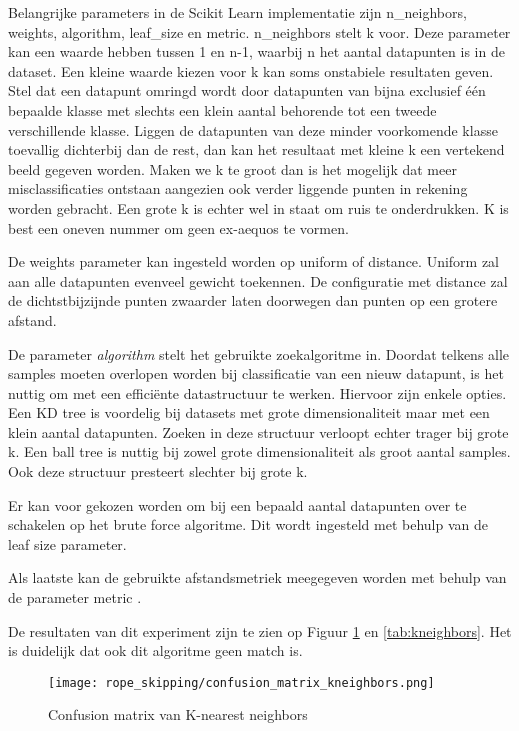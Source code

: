 Belangrijke parameters in de Scikit Learn implementatie zijn n\_neighbors, weights, algorithm, leaf\_size en metric.
n\_neighbors stelt k voor. Deze parameter kan een waarde hebben tussen 1 en n-1, waarbij n het aantal datapunten is in de dataset. Een kleine waarde kiezen voor k kan soms onstabiele resultaten geven. Stel dat een datapunt omringd wordt door datapunten van bijna exclusief één bepaalde klasse met slechts een klein aantal behorende tot een tweede verschillende klasse. Liggen de datapunten van deze minder voorkomende klasse toevallig dichterbij dan de rest, dan kan het resultaat met kleine k een vertekend beeld gegeven worden.
Maken we k te groot dan is het mogelijk dat meer misclassificaties ontstaan aangezien ook verder liggende punten in rekening worden gebracht. Een grote k is echter wel in staat om ruis te onderdrukken.
K is best een oneven nummer om geen ex-aequos te vormen.

De weights parameter kan ingesteld worden op uniform of distance. Uniform zal aan alle datapunten evenveel gewicht toekennen.
De configuratie met distance zal de dichtstbijzijnde punten zwaarder laten doorwegen dan punten op een grotere afstand.

De parameter \textit{algorithm} stelt het gebruikte zoekalgoritme in. Doordat telkens alle samples moeten overlopen worden bij classificatie van een nieuw datapunt, is het nuttig om met een efficiënte datastructuur te werken.
Hiervoor zijn enkele opties. Een KD tree is voordelig bij datasets met grote dimensionaliteit maar met een klein aantal datapunten.
Zoeken in deze structuur verloopt echter trager bij grote k.
Een ball tree is nuttig bij zowel grote dimensionaliteit als groot aantal samples. Ook deze structuur presteert slechter bij grote k.

Er kan voor gekozen worden om bij een bepaald aantal datapunten over te schakelen op het brute force algoritme. Dit wordt ingesteld met behulp van de leaf size parameter.

Als laatste kan de gebruikte afstandsmetriek meegegeven worden met behulp van de parameter metric \cite{ref39}.

De resultaten van dit experiment zijn te zien op Figuur \ref{fig:kneighbors} en \ref{tab:kneighbors}. Het is duidelijk dat ook dit algoritme geen match is.

\begin{figure}[!htpd]
\centering
\caption{Confusion matrix van K-nearest neighbors}\label{fig:kneighbors}
\texttt{[image: rope\_skipping/confusion\_matrix\_kneighbors.png]}   
\end{figure}

